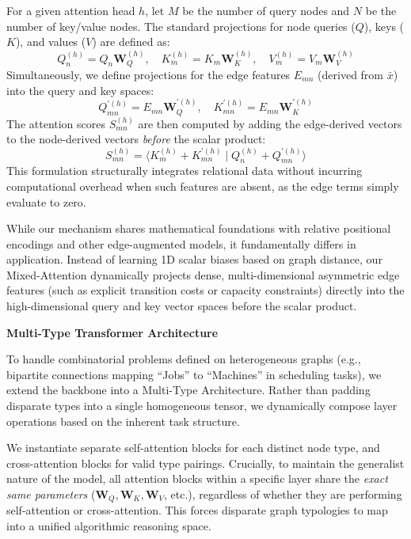 \vspace{0.5em}
\noindent For a given attention head $h$, let $M$ be the number of query nodes and $N$ be the number of key/value nodes. The standard projections for node queries ($Q$), keys ($K$), and values ($V$) are defined as:
\[
Q_n^{(h)} = Q_n \mathbf{W}_Q^{(h)}, \quad K_m^{(h)} = K_m \mathbf{W}_K^{(h)}, \quad V_m^{(h)} = V_m \mathbf{W}_V^{(h)}
\]
Simultaneously, we define projections for the edge features $E_{mn}$ (derived from $\bar{x}$) into the query and key spaces:
\[
Q_{mn}^{\prime (h)} = E_{mn} \mathbf{W}_Q^{\prime (h)}, \quad K_{mn}^{\prime (h)} = E_{mn} \mathbf{W}_K^{\prime (h)}
\]
The attention scores $S_{mn}^{(h)}$ are then computed by adding the edge-derived vectors to the node-derived vectors \textit{before} the scalar product:
\[
S_{mn}^{(h)} = \langle K_m^{(h)} + K_{mn}^{\prime (h)} \mid Q_n^{(h)} + Q_{mn}^{\prime (h)} \rangle
\]
This formulation structurally integrates relational data without incurring computational overhead when such features are absent, as the edge terms simply evaluate to zero. 

\vspace{0.5em}
\noindent While our mechanism shares mathematical foundations with relative positional encodings and other edge-augmented models, it fundamentally differs in application. Instead of learning 1D scalar biases based on graph distance, our Mixed-Attention dynamically projects dense, multi-dimensional asymmetric edge features (such as explicit transition costs or capacity constraints) directly into the high-dimensional query and key vector spaces before the scalar product. 

\vspace{1em}
\noindent\textbf{Multi-Type Transformer Architecture}
\vspace{0.5em}

\noindent To handle combinatorial problems defined on heterogeneous graphs (e.g., bipartite connections mapping ``Jobs'' to ``Machines'' in scheduling tasks), we extend the backbone into a Multi-Type Architecture. Rather than padding disparate types into a single homogeneous tensor, we dynamically compose layer operations based on the inherent task structure.

\vspace{0.5em}
\noindent We instantiate separate self-attention blocks for each distinct node type, and cross-attention blocks for valid type pairings. Crucially, to maintain the generalist nature of the model, all attention blocks within a specific layer share the \textit{exact same parameters} ($\mathbf{W}_Q, \mathbf{W}_K, \mathbf{W}_V$, etc.), regardless of whether they are performing self-attention or cross-attention. This forces disparate graph typologies to map into a unified algorithmic reasoning space.

